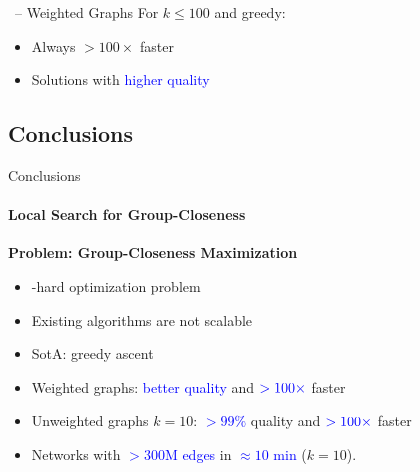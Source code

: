 \documentclass[10pt,titlepage,english,presentation]{beamer}
\newcommand{\emphcolor}{blue}
\renewcommand{\emph}[1]{\textcolor{\emphcolor}{#1}}
\begin{document}
\begin{frame}[t]{\growshrink\ -- Weighted Graphs}
For $k \le 100$ and \wrt greedy:\smallskip

\begin{itemize}
    \small
    \item[\faThumbsOUp] Always $> 100\times$ faster
    \item[\faThumbsOUp] Solutions with \emph{higher quality}
\end{itemize}
\end{frame}

\subsection{Conclusions}

\begin{frame}{Conclusions}
\framesubtitle{Local Search for Group-Closeness}
\textbf{Problem: Group-Closeness Maximization}
\begin{itemize}
    \small
    \item \np-hard optimization problem
    \item Existing algorithms are not scalable
    \item SotA: greedy ascent~\parencite{DBLP:conf/alenex/BergaminiGM18}
\end{itemize}\medskip

\textbf{\growshrink}
\begin{itemize}
    \small
\item Weighted graphs: \emph{better quality} and $\emph{>100\times}$ faster
\item Unweighted graphs $k = 10$: \emph{$> 99\%$} quality and $\emph{>100\times}$ faster
\item Networks with \emph{$>300$M edges} in \emph{$\approx 10$ min} ($k = 10$).
\end{itemize}\medskip


\end{frame}
\end{document}
